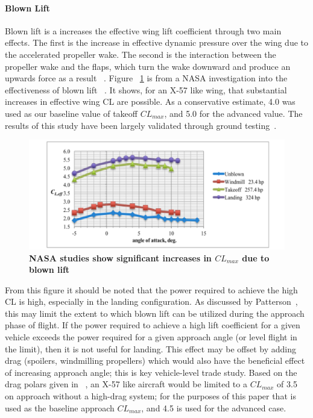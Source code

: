 \documentclass[]{aiaa-tc}%
\begin{document}
\paragraph{Blown Lift}
Blown lift is a increases the effective wing lift coefficient through two main effects.  The first is the increase in effective dynamic pressure over the wing due to the accelerated propeller wake.  The second is the interaction between the propeller wake and the flaps, which turn the wake downward and produce an upwards force as a result ~\cite{MooreDEP}.  Figure ~\ref{f:blown_lift} is from a NASA investigation into the effectiveness of blown lift ~\cite{Deere}.  It shows, for an X-57 like wing, that substantial increases in effective wing CL are possible.  As a conservative estimate, 4.0 was used as our baseline value of takeoff $CL_{max}$, and 5.0 for the advanced value.  The results of this study have been largely validated through ground testing~\cite{Stoll2015}. 

 \begin{figure}[!h]
 	\begin{center}
 	\includegraphics[width = 1.\textwidth]{blown_lift_chart.pdf}
     \caption{\textbf{NASA studies show significant increases in $CL_{max}$ due to blown lift~\cite{study}}}
 	\label{f:blown_lift}
 	\end{center}
 \end{figure}
 
From this figure it should be noted that the power required to achieve the high CL is high, especially in the landing configuration.  As discussed by Patterson~\cite{Patterson2017}, this may limit the extent to which blown lift can be utilized during the approach phase of flight.  If the power required to achieve a high lift coefficient for a given vehicle exceeds the power required for a given approach angle (or level flight in the limit), then it is not useful for landing.  This effect may be offset by adding drag (spoilers, windmilling propellers) which would also have the beneficial effect of increasing approach angle; this is key vehicle-level trade study.  Based on the drag polars given in ~\cite{Deere}, an X-57 like aircraft would be limited to a $CL_{max}$ of 3.5 on approach without a high-drag system; for the purposes of this paper that is used as the baseline approach $CL_{max}$, and 4.5 is used for the advanced case.  
\end{document}
